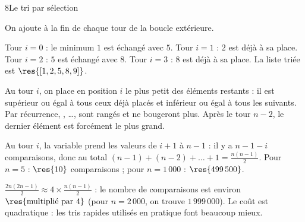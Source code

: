 \begin{corrige}{8}{Le tri par sélection}
\begin{questions}
  \item On ajoute  à la fin de chaque tour de la boucle extérieure.
\begin{codecote}[0.36]
\begin{consolecol}
[1, 2, 8, 5, 9]
[1, 2, 8, 5, 9]
[1, 2, 5, 8, 9]
[1, 2, 5, 8, 9]
\end{consolecol}
\cote
Tour $i=0$ : le minimum $1$ est échangé avec $5$. Tour $i=1$ : $2$ est déjà à sa place. Tour $i=2$ : $5$ est échangé avec $8$.
Tour $i=3$ : $8$ est déjà à sa place. La liste triée est $\res{[1, 2, 5, 8, 9]}$.
\end{codecote}
  \item Au tour $i$, on place en position $i$ le plus petit des éléments restants : il est supérieur ou égal à tous ceux déjà placés
    et inférieur ou égal à tous les suivants. Par récurrence, , …,  sont rangés et ne bougeront plus. Après le
    tour $n-2$, le dernier élément est forcément le plus grand.
  \item Au tour $i$, la variable  prend les valeurs de $i+1$ à $n-1$ : il y a $n-1-i$ comparaisons, donc au total
    $(n-1)+(n-2)+\dots+1=\frac{n(n-1)}{2}$. Pour $n=5$ : $\res{10}$ comparaisons ; pour $n=1\,000$ : $\res{499\,500}$.
  \item $\frac{2n(2n-1)}{2}\approx4\times\frac{n(n-1)}{2}$ : le nombre de comparaisons est environ $\res{\text{multiplié par }4}$
    (pour $n=2\,000$, on trouve $1\,999\,000$). Le coût est quadratique : les tris rapides utilisés en pratique font beaucoup mieux.
\end{questions}
\end{corrige}

